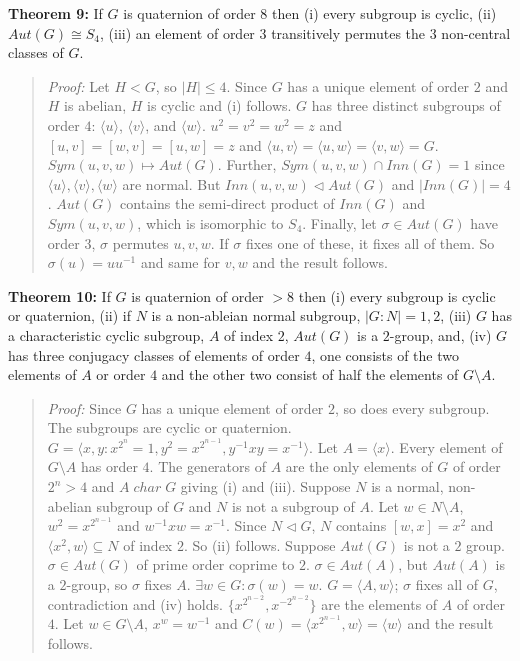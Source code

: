 {\bf Theorem 9:} If $G$ is quaternion of order $8$ then (i) every subgroup is cyclic, (ii) $Aut(G) \cong S_4$,
(iii) an element of order $3$ transitively permutes the $3$ non-central classes of $G$.
\begin{quote}
\emph{Proof:}
Let $H < G$, so $|H| \leq 4$.  Since $G$ has a unique element of order $2$ and $H$ is abelian, $H$ is cyclic and
(i) follows.  $G$ has three distinct subgroups of order $4$:
$\langle u \rangle$,
$\langle v \rangle$, and
$\langle w \rangle$. $u^2=v^2=w^2 =z$ and $[u,v] = [w,v] = [u,w] =z$ and
$\langle u, v \rangle = 
\langle u, w \rangle = 
\langle v, w \rangle = G$.  $Sym(u,v,w) \mapsto Aut(G)$.  Further, $Sym(u,v,w) \cap Inn(G) = 1$ since
$\langle u \rangle, \langle v \rangle, \langle w \rangle$ are normal.  But $Inn(u,v,w) \lhd Aut(G)$ and
$|Inn(G)| = 4$.  $Aut(G)$ contains the semi-direct product of $Inn(G)$ and $Sym(u, v, w)$, which is
isomorphic to $S_4$.  Finally, let  $\sigma \in Aut(G)$ have order $3$, $\sigma$ permutes $u,v,w$.
If $\sigma$ fixes one of these, it fixes all of them.  So $\sigma(u)= u u^{-1}$ and same for $v, w$
and the result follows.
\end{quote}
{\bf Theorem 10:} If $G$ is quaternion of order $>8$ then (i) every subgroup is cyclic or quaternion,
(ii) if $N$ is a non-ableian normal subgroup, $|G:N| = 1, 2$,
(iii) $G$ has a characteristic cyclic subgroup, $A$ of index $2$,
$Aut(G)$ is a $2$-group, and,
(iv) $G$ has three conjugacy classes of elements of order $4$, one consists of the two elements of $A$ or order $4$
and the other two consist of half the elements of $G \setminus A$.
\begin{quote}
\emph{Proof:}
Since $G$ has a unique element of order $2$, so does every subgroup.
The subgroups are cyclic or quaternion.
$G = \langle x, y: x^{2^n}= 1, y^2= x^{2^{n-1}}, y^{-1} x y = x^{-1} \rangle$.  Let $A = \langle x \rangle$.
Every element of $G \setminus A$ has order $4$.  The generators of $A$ are the only elements of $G$
of order $2^n > 4$ and $A \; char \; G$ giving (i) and (iii).  Suppose $N$ is a normal, non-abelian subgroup
of $G$ and $N$ is not a subgroup of $A$.  Let $w \in N \setminus A$, $w^2 = x^{2^{n-1}}$ and
$w^{-1} x w = x^{-1}$.  Since $N \lhd G$, $N$ contains $[w,x]=x^2$ and $\langle x^2, w \rangle \subseteq N$
of index $2$.  So (ii) follows.
Suppose $Aut(G)$ is not a $2$ group. $\sigma \in Aut(G)$ of prime order coprime to $2$. $\sigma \in Aut(A)$,
but $Aut(A)$ is a $2$-group, so $\sigma$ fixes $A$.  $\exists w \in G: \sigma(w) =w$.
$G = \langle A, w \rangle$; $\sigma$ fixes all of $G$, contradiction and (iv) holds.
$\{ x^{2^{n-2}},x^{-2^{n-2}} \} $ are the elements of $A$ of order $4$.  Let $w \in G \setminus A$,
$x^w = w^{-1}$ and $C(w)= \langle x^{2^{n-1}}, w \rangle = \langle w \rangle$ and the result follows.
\end{quote}
